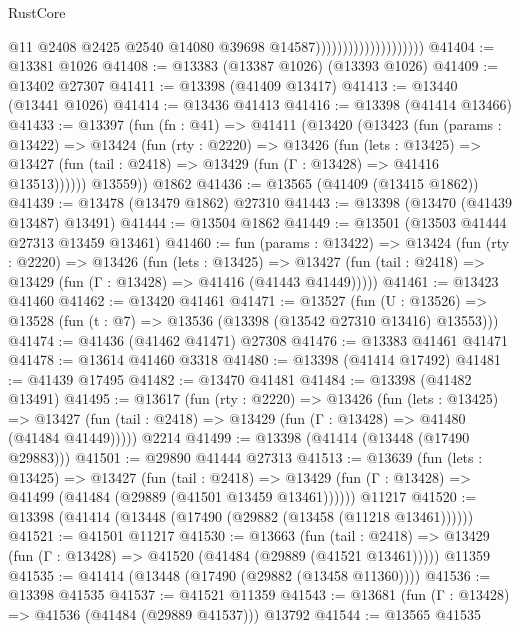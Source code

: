 \begin{lexlean}{RustCore}
\begin{coremodule}
                                            @11
                                            @2408
                                            @2425
                                            @2540
                                            @14080
                                            @39698
                                            @14587))))))))))))))))))))
@41404 := @13381 @1026
@41408 := @13383 (@13387 @1026) (@13393 @1026)
@41409 := @13402 @27307
@41411 := @13398 (@41409 @13417)
@41413 := @13440 (@13441 @1026)
@41414 := @13436 @41413
@41416 := @13398 (@41414 @13466)
@41433 := @13397
    (fun (fn : @41) =>
    @41411
      (@13420
        (@13423
          (fun (params : @13422) =>
          @13424
            (fun (rty : @2220) =>
            @13426
              (fun (lets : @13425) =>
              @13427 (fun (tail : @2418) => @13429 (fun (Γ : @13428) => @41416 @13513))))))
        @13559))
    @1862
@41436 := @13565 (@41409 (@13415 @1862))
@41439 := @13478 (@13479 @1862) @27310
@41443 := @13398 (@13470 (@41439 @13487) @13491)
@41444 := @13504 @1862
@41449 := @13501 (@13503 @41444 @27313 @13459 @13461)
@41460 := fun (params : @13422) =>
  @13424
    (fun (rty : @2220) =>
    @13426
      (fun (lets : @13425) =>
      @13427 (fun (tail : @2418) => @13429 (fun (Γ : @13428) => @41416 (@41443 @41449)))))
@41461 := @13423 @41460
@41462 := @13420 @41461
@41471 := @13527
    (fun (U : @13526) => @13528 (fun (t : @7) => @13536 (@13398 (@13542 @27310 @13416) @13553)))
@41474 := @41436 (@41462 @41471) @27308
@41476 := @13383 @41461 @41471
@41478 := @13614 @41460 @3318
@41480 := @13398 (@41414 @17492)
@41481 := @41439 @17495
@41482 := @13470 @41481
@41484 := @13398 (@41482 @13491)
@41495 := @13617
    (fun (rty : @2220) =>
    @13426
      (fun (lets : @13425) =>
      @13427 (fun (tail : @2418) => @13429 (fun (Γ : @13428) => @41480 (@41484 @41449)))))
    @2214
@41499 := @13398 (@41414 (@13448 (@17490 @29883)))
@41501 := @29890 @41444 @27313
@41513 := @13639
    (fun (lets : @13425) =>
    @13427
      (fun (tail : @2418) =>
      @13429 (fun (Γ : @13428) => @41499 (@41484 (@29889 (@41501 @13459 @13461))))))
    @11217
@41520 := @13398 (@41414 (@13448 (@17490 (@29882 (@13458 (@11218 @13461))))))
@41521 := @41501 @11217
@41530 := @13663
    (fun (tail : @2418) => @13429 (fun (Γ : @13428) => @41520 (@41484 (@29889 (@41521 @13461)))))
    @11359
@41535 := @41414 (@13448 (@17490 (@29882 (@13458 @11360))))
@41536 := @13398 @41535
@41537 := @41521 @11359
@41543 := @13681 (fun (Γ : @13428) => @41536 (@41484 (@29889 @41537))) @13792
@41544 := @13565 @41535

\end{coremodule}
\end{lexlean}
